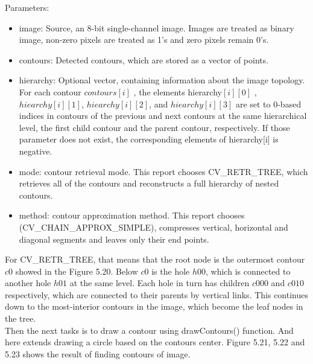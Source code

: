 Parameters:	
\begin{itemize}
    \item image: Source, an 8-bit single-channel image. Images are treated as binary image, non-zero pixels are treated as 1’s and zero pixels remain 0’s.
    \item contours: Detected contours, which are stored as a vector of points.
    \item hierarchy: Optional vector, containing information about the image topology. For each contour $contours[i]$ , the elements hierarchy$[i][0]$ , $hiearchy[i][1]$, $hiearchy[i][2]$, and $hiearchy[i][3]$ are set to 0-based indices in contours of the previous and next contours at the same hierarchical level, the first child contour and the parent contour, respectively. If those parameter does not exist, the corresponding elements of hierarchy[i] is negative.
    \item mode: contour retrieval mode. This report chooses CV\_RETR\_TREE, which retrieves all of the contours and reconstructs a full hierarchy of nested contours.
    \item method: contour approximation method. This report chooses (CV\_CHAIN\_APPROX\_SIMPLE), compresses vertical, horizontal and diagonal segments and leaves only their end points.
\end{itemize}

For CV\_RETR\_TREE, that means that the root node is the outermost contour $c0$ showed in the Figure 5.20. Below $c0$ is the hole $h00$, which is connected to another hole $h01$ at the
same level. Each hole in turn has children $c000$ and $c010$ respectively, which are connected to their parents by vertical links. This continues down to the most-interior contours in the image, which become the leaf nodes in the tree.\\

Then the next tasks is to draw a contour using drawContours() function. And here extends drawing a circle based on the contours center. Figure 5.21, 5.22 and 5.23 shows the result of finding contours of image.


